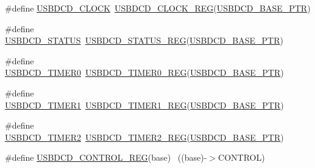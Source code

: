 \begin{DoxyCompactItemize}
\item 
\#define \hyperlink{group___u_s_b_d_c_d___register___accessor___macros_ga543817a50fb8eddab8be17eeac66ed2f}{U\+S\+B\+D\+C\+D\+\_\+\+C\+L\+O\+CK}~\hyperlink{group___u_s_b_d_c_d___register___accessor___macros_ga8bba9961332354ffeb00ecf680537695}{U\+S\+B\+D\+C\+D\+\_\+\+C\+L\+O\+C\+K\+\_\+\+R\+EG}(\hyperlink{group___u_s_b_d_c_d___peripheral_ga6289dc687e9b991508629237aeb61755}{U\+S\+B\+D\+C\+D\+\_\+\+B\+A\+S\+E\+\_\+\+P\+TR})
\item 
\#define \hyperlink{group___u_s_b_d_c_d___register___accessor___macros_gacf092152e7551433538eb6aace1bc43a}{U\+S\+B\+D\+C\+D\+\_\+\+S\+T\+A\+T\+US}~\hyperlink{group___u_s_b_d_c_d___register___accessor___macros_ga99a4ce6cc19f531916ab02aea07e14a9}{U\+S\+B\+D\+C\+D\+\_\+\+S\+T\+A\+T\+U\+S\+\_\+\+R\+EG}(\hyperlink{group___u_s_b_d_c_d___peripheral_ga6289dc687e9b991508629237aeb61755}{U\+S\+B\+D\+C\+D\+\_\+\+B\+A\+S\+E\+\_\+\+P\+TR})
\item 
\#define \hyperlink{group___u_s_b_d_c_d___register___accessor___macros_ga696142965d4e1a121400c0f9e42e9c30}{U\+S\+B\+D\+C\+D\+\_\+\+T\+I\+M\+E\+R0}~\hyperlink{group___u_s_b_d_c_d___register___accessor___macros_ga5eab5fbaf9280881c33dc0ed61dfbb80}{U\+S\+B\+D\+C\+D\+\_\+\+T\+I\+M\+E\+R0\+\_\+\+R\+EG}(\hyperlink{group___u_s_b_d_c_d___peripheral_ga6289dc687e9b991508629237aeb61755}{U\+S\+B\+D\+C\+D\+\_\+\+B\+A\+S\+E\+\_\+\+P\+TR})
\item 
\#define \hyperlink{group___u_s_b_d_c_d___register___accessor___macros_gacf474d5bde6a1007416398682f014768}{U\+S\+B\+D\+C\+D\+\_\+\+T\+I\+M\+E\+R1}~\hyperlink{group___u_s_b_d_c_d___register___accessor___macros_ga88e54db7c70cc1d168f792ffd054ceea}{U\+S\+B\+D\+C\+D\+\_\+\+T\+I\+M\+E\+R1\+\_\+\+R\+EG}(\hyperlink{group___u_s_b_d_c_d___peripheral_ga6289dc687e9b991508629237aeb61755}{U\+S\+B\+D\+C\+D\+\_\+\+B\+A\+S\+E\+\_\+\+P\+TR})
\item 
\#define \hyperlink{group___u_s_b_d_c_d___register___accessor___macros_gace4d8422fa65db55d5ebf6e94912d702}{U\+S\+B\+D\+C\+D\+\_\+\+T\+I\+M\+E\+R2}~\hyperlink{group___u_s_b_d_c_d___register___accessor___macros_ga0c14ac0966245ae63c84653a5c9ee453}{U\+S\+B\+D\+C\+D\+\_\+\+T\+I\+M\+E\+R2\+\_\+\+R\+EG}(\hyperlink{group___u_s_b_d_c_d___peripheral_ga6289dc687e9b991508629237aeb61755}{U\+S\+B\+D\+C\+D\+\_\+\+B\+A\+S\+E\+\_\+\+P\+TR})
\item 
\#define \hyperlink{group___u_s_b_d_c_d___register___accessor___macros_ga257d5151df6a12b6afd43a0ab18bd985}{U\+S\+B\+D\+C\+D\+\_\+\+C\+O\+N\+T\+R\+O\+L\+\_\+\+R\+EG}(base)                              ~((base)-\/$>$C\+O\+N\+T\+R\+OL)

\end{DoxyCompactItemize}
